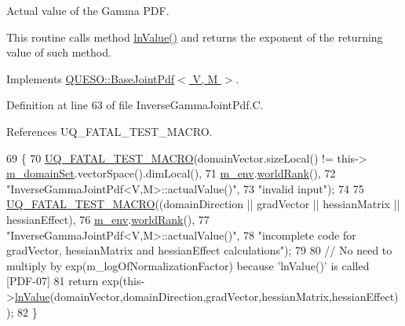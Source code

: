 Actual value of the Gamma P\-D\-F. 

This routine calls method \hyperlink{class_q_u_e_s_o_1_1_inverse_gamma_joint_pdf_a08dbbb7054026fcf4d429870cbe5d36f}{ln\-Value()} and returns the exponent of the returning value of such method. 

Implements \hyperlink{class_q_u_e_s_o_1_1_base_joint_pdf_a3c367a0cc3fb707a136c5df47dd414c1}{Q\-U\-E\-S\-O\-::\-Base\-Joint\-Pdf$<$ V, M $>$}.



Definition at line 63 of file Inverse\-Gamma\-Joint\-Pdf.\-C.



References U\-Q\-\_\-\-F\-A\-T\-A\-L\-\_\-\-T\-E\-S\-T\-\_\-\-M\-A\-C\-R\-O.


\begin{DoxyCode}
69 \{
70   \hyperlink{_defines_8h_a56d63d18d0a6d45757de47fcc06f574d}{UQ\_FATAL\_TEST\_MACRO}(domainVector.sizeLocal() != this->
      \hyperlink{class_q_u_e_s_o_1_1_base_scalar_function_a67696e86211197938c72cd11863f5cf8}{m\_domainSet}.vectorSpace().dimLocal(),
71                       \hyperlink{class_q_u_e_s_o_1_1_base_scalar_function_adf44141aeb765d97613286f88f235f04}{m\_env}.\hyperlink{class_q_u_e_s_o_1_1_base_environment_a78b57112bbd0e6dd0e8afec00b40ffa7}{worldRank}(),
72                       \textcolor{stringliteral}{"InverseGammaJointPdf<V,M>::actualValue()"},
73                       \textcolor{stringliteral}{"invalid input"});
74 
75   \hyperlink{_defines_8h_a56d63d18d0a6d45757de47fcc06f574d}{UQ\_FATAL\_TEST\_MACRO}((domainDirection || gradVector || hessianMatrix || hessianEffect),
76                       \hyperlink{class_q_u_e_s_o_1_1_base_scalar_function_adf44141aeb765d97613286f88f235f04}{m\_env}.\hyperlink{class_q_u_e_s_o_1_1_base_environment_a78b57112bbd0e6dd0e8afec00b40ffa7}{worldRank}(),
77                       \textcolor{stringliteral}{"InverseGammaJointPdf<V,M>::actualValue()"},
78                       \textcolor{stringliteral}{"incomplete code for gradVector, hessianMatrix and hessianEffect calculations"});
79 
80   \textcolor{comment}{// No need to multiply by exp(m\_logOfNormalizationFactor) because 'lnValue()' is called [PDF-07]}
81   \textcolor{keywordflow}{return} exp(this->\hyperlink{class_q_u_e_s_o_1_1_inverse_gamma_joint_pdf_a08dbbb7054026fcf4d429870cbe5d36f}{lnValue}(domainVector,domainDirection,gradVector,hessianMatrix,hessianEffect));
82 \}
\end{DoxyCode}
